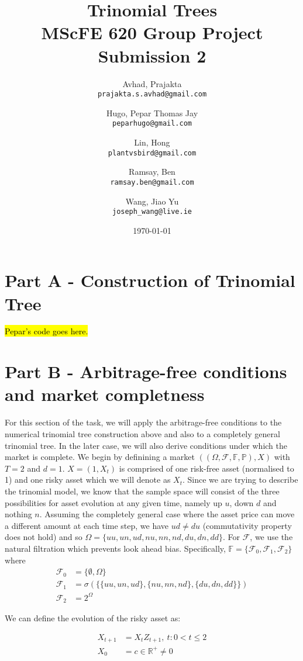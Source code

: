 \documentclass{article}
\title{Trinomial Trees \\ MScFE 620 Group Project Submission 2}
\date{\today}
\author{
  Avhad, Prajakta\\
  \texttt{prajakta.s.avhad@gmail.com}
  \and
  Hugo, Pepar Thomas Jay\\
  \texttt{peparhugo@gmail.com}
  \and
  Lin, Hong\\
  \texttt{plantvsbird@gmail.com}
  \and
  Ramsay, Ben\\
  \texttt{ramsay.ben@gmail.com}
  \and
  Wang, Jiao Yu\\
  \texttt{joseph\_wang@live.ie}
}
\begin{document}
\maketitle  


\section{Part A - Construction of Trinomial Tree}

\hl{Pepar's code goes here.}




\section{Part B - Arbitrage-free conditions and market completness}
For this section of the task, we will apply the arbitrage-free conditions to the numerical trinomial tree construction above and also to a completely general trinomial tree. In the later case, we will also derive conditions under which the market is complete. We begin by definining a market $((\Omega, \mathcal{F},\mathbb{F},\mathbb{P}),X)$ with $T=2$ and $d=1$. $X = (1,X_t)$ is comprised of one risk-free asset (normalised to 1) and one risky asset which we will denote as $X_t$. Since we are trying to describe the trinomial model, we know that the sample space will consist of the three possibilities for asset evolution at any given time, namely up $u$, down $d$ and nothing $n$. Assuming the completely general case where the asset price can move a different amount at each time step, we have $ud\neq du$ (commutativity property does not hold) and so $\Omega = \{uu,un,ud,nu,nn,nd,du,dn,dd\}$. For $\mathcal{F}$, we use the natural filtration which prevents look ahead bias. Specifically, $\mathbb{F} = \{\mathcal{F}_0, \mathcal{F}_1, \mathcal{F}_2\}$ where 
\begin{align*}
    \mathcal{F}_0 &= \{\emptyset,\Omega\} \\
    \mathcal{F}_1 &= \sigma(\{\{uu,un,ud\},\{nu,nn,nd\},\{du,dn,dd\}\}) \\
    \mathcal{F}_2 &= 2^\Omega
\end{align*}

We can define the evolution of the risky asset as:

\begin{align*}
    X_{t+1} &= X_tZ_{t+1},\medspace t:0< t\le 2\\
    X_0 & = c\in\mathbb{R}^+\neq0
\end{align*}
\end{document}
